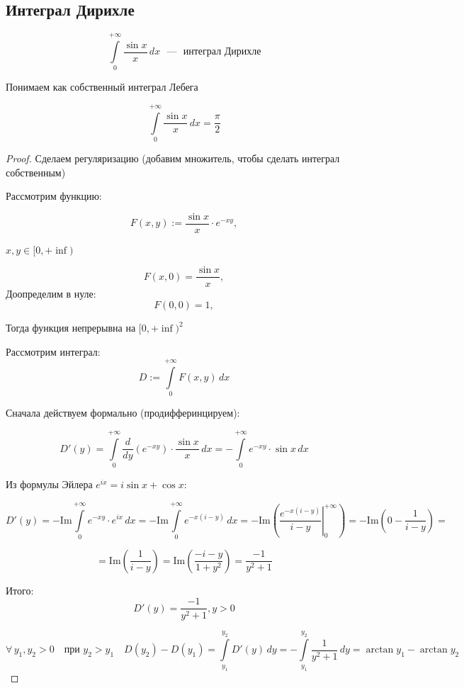 \subsection{Интеграл Дирихле}

\[
    \int\limits_0^{+\infty} \frac{\sin x}{x} \, dx \text{ ~---~ интеграл Дирихле}
\]

\begin{note}
Понимаем как собственный интеграл Лебега
\end{note}

\begin{theorem}
\[
    \int\limits_0^{+\infty} \frac{\sin x}{x} \, dx = \frac{\pi}{2}
\]

\end{theorem}

\begin{proof}

\noindent

Сделаем регуляризацию (добавим множитель, чтобы сделать интеграл собственным)
    
Рассмотрим функцию:

\[
F(x, y) := \frac{\sin x}{x} \cdot e^{-x y},
\]

$x, y \in [0, +\inf)$

\[
F(x, 0) = \frac{\sin x}{x},
\]
Доопределим в нуле:
\[
F(0, 0) = 1,  
\]

Тогда функция непрерывна на $[0, +\inf) ^2$

Рассмотрим интеграл:
\[
D := \int\limits_0^{+\infty}F(x, y) \,d x
\]

Сначала действуем формально (продифферинцируем):

\[
    D'(y) = \int\limits_0^{+\infty} \frac{d}{dy} \left( e^{-x y} \right) \cdot \frac{\sin x}{x} \, dx = - \int\limits_0^{+\infty} e^{-x y} \cdot \sin x \, dx
\]

Из формулы Эйлера $e^{ix} = i \sin x + \cos x$:

\[
D'(y) = -\mathrm{Im} \int\limits_0^{+\infty} e^{-xy} \cdot e^{ix} \, dx
= -\mathrm{Im} \int\limits_0^{+\infty} e^{-x(i - y)}\, dx
= -\mathrm{Im} \left( \left. \frac{e^{-x(i - y)}}{i - y} \right|_0^{+\infty} \right) = -\mathrm{Im}\left( 0 - \frac{1}{i-y}\right) =
\]

\[
= \mathrm{Im} \left( \frac{1}{i - y} \right) = \mathrm{Im} \left( \frac{-i - y}{1 + y^2} \right)
= \frac{-1}{y^2 + 1}
\] 

Итого:
\[
D'(y) = \frac{-1}{y^2 + 1}, y > 0
\]

\[
\forall\, y_1, y_2 > 0 \quad \text{при } y_2 > y_1 \quad
D(y_2) - D(y_1) = \int\limits_{y_1}^{y_2} D'(y) \, dy
= - \int\limits_{y_1}^{y_2} \frac{1}{y^2 + 1} \, dy = \arctan{y_1} - \arctan{y_2}
\]


\end{proof}

